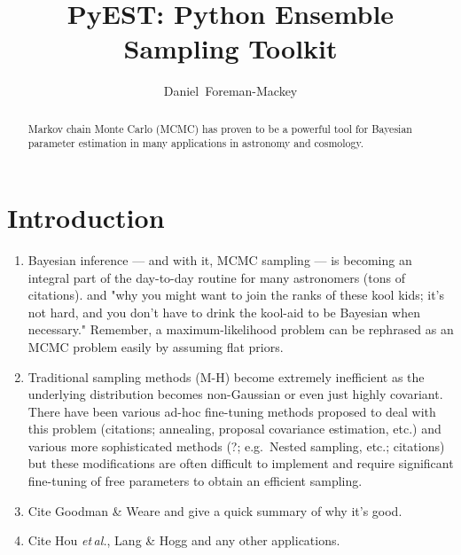 \documentclass[12pt,preprint]{aastex}
\newcommand{\foreign}[1]{\emph{#1}}
\newcommand{\etal}{\foreign{et\,al.}}
\begin{document}
\title{PyEST: Python Ensemble Sampling Toolkit}
\author{Daniel~Foreman-Mackey}

\begin{abstract}

    Markov chain Monte Carlo (MCMC) has proven to be a powerful tool for Bayesian
    parameter estimation in many applications in astronomy and cosmology.

\end{abstract}

\keywords{
}

\section{Introduction}

\begin{enumerate}

    \item Bayesian inference  --- and with it, MCMC sampling --- is becoming an
        integral part of the day-to-day routine for many astronomers (tons of
        citations). and "why you might want to join the ranks of these kool kids;
        it's not hard, and you don't have to drink the kool-aid to be Bayesian
        when necessary." Remember, a maximum-likelihood problem can be rephrased
        as an MCMC problem easily by assuming flat priors.

    \item Traditional sampling methods (M-H) become extremely inefficient as the
        underlying distribution becomes non-Gaussian or even just highly covariant.
        There have been various ad-hoc fine-tuning methods proposed to deal with
        this problem (citations; annealing, proposal covariance estimation, etc.)
        and various more sophisticated methods (?; e.g.~Nested sampling, etc.;
        citations) but these modifications are often difficult to implement and
        require significant fine-tuning of free parameters to obtain an efficient
        sampling.

    \item Cite Goodman \& Weare and give a quick summary of why it's good.

    \item Cite Hou \etal, Lang \& Hogg and any other applications.

\end{enumerate}
\end{document}
